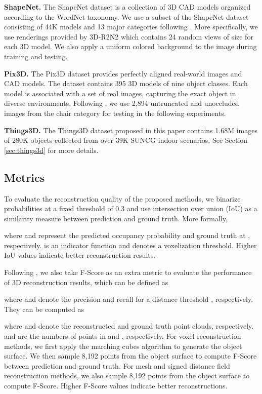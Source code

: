 \documentclass[twocolumn]{svjour3}
\begin{document}
\noindent \textbf{ShapeNet.}
The ShapeNet dataset \citep{DBLP:conf/cvpr/WuSKYZTX15} is a collection of 3D CAD models organized according to the WordNet taxonomy.
We use a subset of the ShapeNet dataset consisting of 44K models and 13 major categories following \cite{DBLP:conf/eccv/ChoyXGCS16}.
More specifically, we use renderings provided by 3D-R2N2 which contains 24 random views of size  for each 3D model.
We also apply a uniform colored background to the image during training and testing.

\noindent \textbf{Pix3D.}
The Pix3D dataset \citep{DBLP:conf/cvpr/Sun0ZZZXTF18} provides perfectly aligned real-world images and CAD models.
The dataset contains 395 3D models of nine object classes.
Each model is associated with a set of real images, capturing the exact object in diverse environments.
Following \cite{DBLP:conf/cvpr/Sun0ZZZXTF18}, we use 2,894 untruncated and unoccluded images from the chair category for testing in the following experiments.

\noindent \textbf{Things3D.}
The Things3D dataset proposed in this paper contains 1.68M images of 280K objects collected from over 39K SUNCG \citep{DBLP:conf/cvpr/SongYZCSF17} indoor scenarios.
See Section \ref{sec:things3d} for more details.

\subsection{Metrics}

To evaluate the reconstruction quality of the proposed methods, we binarize probabilities at a fixed threshold of 0.3 and use intersection over union (IoU) as a similarity measure between prediction and ground truth.
More formally,


where  and  represent the predicted occupancy probability and ground truth at , respectively.
 is an indicator function and  denotes a voxelization threshold.
Higher IoU values indicate better reconstruction results.

Following \cite{DBLP:conf/cvpr/TatarchenkoRRLK19}, we also take F-Score as an extra metric to evaluate the performance of 3D reconstruction results, which can be defined as


where  and  denote the precision and recall for a distance threshold , respectively.
They can be computed as 




where  and  denote the reconstructed and ground truth point clouds, respectively.
 and  are the numbers of points in  and , respectively. 
For voxel reconstruction methods, we first apply the marching cubes algorithm \citep{DBLP:conf/siggraph/LorensenC87} to generate the object surface.
We then sample 8,192 points from the object surface to compute F-Score between prediction and ground truth.
For mesh and signed distance field reconstruction methods, we also sample 8,192 points from the object surface to compute F-Score.
Higher F-Score values indicate better reconstructions.
\end{document}
